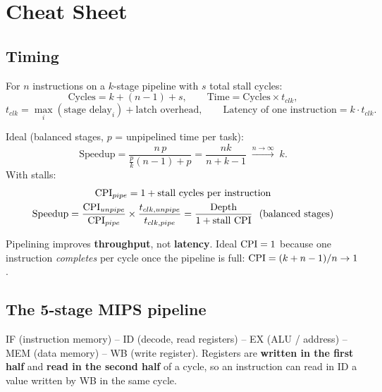 \documentclass[11pt]{article}
\begin{document}
\sloppy
{}

\section{Cheat Sheet}

\subsection{Timing}
\begin{theorem}
For $n$ instructions on a $k$-stage pipeline with $s$ total stall cycles:
\[
  \text{Cycles} = k + (n-1) + s, \qquad
  \text{Time} = \text{Cycles}\times t_{clk},
\]
\[
  t_{clk} = \max_i(\text{stage delay}_i) + \text{latch overhead},
  \qquad
  \text{Latency of one instruction} = k\cdot t_{clk}.
\]
\end{theorem}

\begin{theorem}[Speedup]
Ideal (balanced stages, $p$ = unpipelined time per task):
\[
  \text{Speedup} = \frac{n\,p}{\frac{p}{k}(n-1)+p} = \frac{nk}{n+k-1}
  \;\xrightarrow{n\to\infty}\; k.
\]
With stalls:
\begin{gather*}
  \mathrm{CPI}_{pipe} = 1 + \text{stall cycles per instruction}\\
  \text{Speedup} = \frac{\mathrm{CPI}_{unpipe}}{\mathrm{CPI}_{pipe}}\times
  \frac{t_{clk,unpipe}}{t_{clk,pipe}}
  = \frac{\text{Depth}}{1+\text{stall CPI}} \ \ (\text{balanced stages})
\end{gather*}
\end{theorem}

\begin{note}
Pipelining improves \textbf{throughput}, not \textbf{latency}. Ideal
$\mathrm{CPI}=1$ because one instruction \emph{completes} per cycle once the
pipeline is full: $\mathrm{CPI} = (k+n-1)/n \to 1$.
\end{note}

\subsection{The 5-stage MIPS pipeline}
IF (instruction memory) -- ID (decode, read registers) -- EX (ALU / address)
-- MEM (data memory) -- WB (write register). Registers are
\textbf{written in the first half} and \textbf{read in the second half} of a
cycle, so an instruction can read in ID a value written by WB in the same
cycle.
\end{document}
